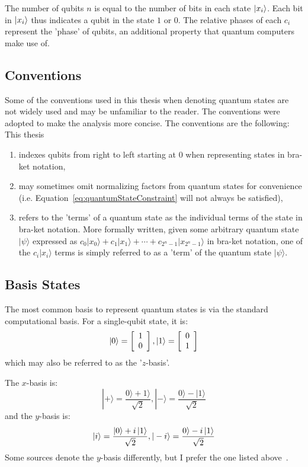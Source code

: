 The number of qubits $n$ is equal to the number of bits in each state $\ket{x_i}$. Each bit in $\ket{x_i}$ thus indicates a qubit in the state $1$ or $0$. The relative phases of each $c_i$ represent the 'phase' of qubits, an additional property that quantum computers make use of.

\subsection{Conventions}
Some of the conventions used in this thesis when denoting quantum states are not widely used and may be unfamiliar to the reader. The conventions were adopted to make the analysis more concise. The conventions are the following: This thesis
\begin{enumerate}
    \item indexes qubits from right to left starting at 0 when representing states in bra-ket notation,
    \item may sometimes omit normalizing factors from quantum states for convenience (i.e. Equation~\eqref{eq:quantumStateConstraint} will not always be satisfied),
    \item refers to the 'terms' of a quantum state as the individual terms of the state in bra-ket notation. More formally written, given some arbitrary quantum state $|\psi\rangle$ expressed as $c_0|x_0\rangle + c_1|x_1\rangle + \cdots + c_{2^n - 1}|x_{2^n - 1}\rangle$ in bra-ket notation, one of the $c_i|x_i\rangle$ terms is simply referred to as a 'term' of the quantum state $|\psi\rangle$.
\end{enumerate}

\subsection{Basis States}
\label{subsection:basisStates}
The most common basis to represent quantum states is via the standard computational basis. For a single-qubit state, it is:
$$\ket{0} = \left[\begin{array}{c}
1 \\
0
\end{array}\right], \ket{1} = \left[\begin{array}{c}
0 \\
1
\end{array}\right]$$
which may also be referred to as the '$z$-basis'.

The $x$-basis is:
$$|+\rangle=\frac{0\rangle+1\rangle}{\sqrt{2}},|-\rangle=\frac{0\rangle-|1\rangle}{\sqrt{2}}$$
and the $y$-basis is:
$$|i\rangle=\frac{|0\rangle+i\ket{1}}{\sqrt{2}},|-i\rangle=\frac{0\rangle-i\ket{1}}{\sqrt{2}}$$
Some sources denote the $y$-basis differently, but I prefer the one listed above~\cite{basisStates}.

